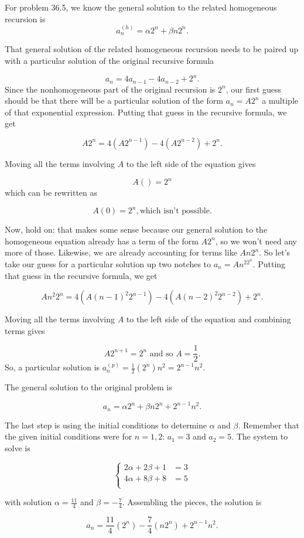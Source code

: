 \begin{Solution}{37.3}

For problem 36.5, we know the general solution to the related homogeneous recursion is
\[
a_n^{(h)} = \alpha2^n +\beta n 2^n.
\]

That general solution  of the related homogeneous recursion  needs to be paired up with a particular solution of the original 
recursive formula

\[
a_n = 4a_{n-1}-4a_{n-2}+ 2^n.
\]
Since the nonhomogeneous part of the original recursion is  $2^n$, our first guess should be that there
will be a particular solution of the form $a_n = A2^n$ a multiple of that exponential expression.  Putting that guess in the recursive formula, we get

\[
A2^n = 4(A2^{n-1}) - 4(A2^{n-2}) + 2^n.
\]

Moving all the terms involving $A$ to the left side of the equation gives

\[
A() = 2^n
\]
which can be rewritten as

\[
A(0) = 2^n, \text{which isn't possible}.
\]

Now, hold on: that makes some sense because our general solution to the homogeneous equation already
has a term of the form $A2^n$, so we won't need any more of those. Likewise, we are already accounting
for terms like $An2^n$. So let's take our guess for a particular solution up two notches to $a_n= An^22^n$.
Putting that guess in the recursive formula, we get

\[
An^{2}2^n = 4(A(n-1)^{2}2^{n-1}) - 4(A(n-2)^{2}2^{n-2}) + 2^n.
\]

Moving all the terms involving $A$ to the left side of the equation  and combining terms gives

\[
A2^{n+1} = 2^n \text{ and so } A= \frac{1}{2}.
\]
 So, a particular solution is $a_{n}^{(p)} =\frac{1}{2}(2^{n}) n^{2}= 2^{n-1}n^{2}$.
 
 The general solution to the original problem is
 
 \[
 a_{n} = \alpha2^n +\beta n 2^n + 2^{n-1}n^{2}.
 \]
 
 The last step is using the initial conditions to determine $\alpha$ and $\beta$. Remember that the given initial conditions were for $n = 1,2$: $a_1 = 3$ and $a_2 = 5$. The system to solve is

\[
  \left\{
    \begin{aligned}
     2\alpha + 2\beta  + 1&= 3\\
     4\alpha + 8\beta +8 &= 5\\
     \end{aligned}
   \right.
\]

with solution $\alpha = \frac{11}{4}$ and $\beta = -\frac{7}{4}$.  Assembling the pieces,  the solution is

\[
a_n = \frac{11}{4}(2^n) - \frac{7}{4} (n 2^n)+ 2^{n-1}n^{2}.
\]


\end{Solution}

